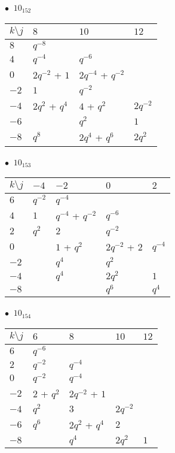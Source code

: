 %
\begin{minipage}{\linewidth}
$\bullet\ $ $10_{152}$ \vspace{0.5em} \\
\begin{tabular}{l|lll}
$k \setminus j$ & $8$ & $10$ & $12$ \\
\hline
$8$ & $q^{-8}$ &  &  \\
$4$ & $q^{-4}$ & $q^{-6}$ &  \\
$0$ & $2q^{-2}$ + $1$ & $2q^{-4}$ + $q^{-2}$ &  \\
$-2$ & $1$ & $q^{-2}$ &  \\
$-4$ & $2q^{2}$ + $q^{4}$ & $4$ + $q^{2}$ & $2q^{-2}$ \\
$-6$ &  & $q^{2}$ & $1$ \\
$-8$ & $q^{8}$ & $2q^{4}$ + $q^{6}$ & $2q^{2}$ \\
\end{tabular}
\vspace{2em}
\end{minipage}
%
\begin{minipage}{\linewidth}
$\bullet\ $ $10_{153}$ \vspace{0.5em} \\
\begin{tabular}{l|llll}
$k \setminus j$ & $-4$ & $-2$ & $0$ & $2$ \\
\hline
$6$ & $q^{-2}$ & $q^{-4}$ &  &  \\
$4$ & $1$ & $q^{-4}$ + $q^{-2}$ & $q^{-6}$ &  \\
$2$ & $q^{2}$ & $2$ & $q^{-2}$ &  \\
$0$ &  & $1$ + $q^{2}$ & $2q^{-2}$ + $2$ & $q^{-4}$ \\
$-2$ &  & $q^{4}$ & $q^{2}$ &  \\
$-4$ &  & $q^{4}$ & $2q^{2}$ & $1$ \\
$-8$ &  &  & $q^{6}$ & $q^{4}$ \\
\end{tabular}
\vspace{2em}
\end{minipage}
%
\begin{minipage}{\linewidth}
$\bullet\ $ $10_{154}$ \vspace{0.5em} \\
\begin{tabular}{l|llll}
$k \setminus j$ & $6$ & $8$ & $10$ & $12$ \\
\hline
$6$ & $q^{-6}$ &  &  &  \\
$2$ & $q^{-2}$ & $q^{-4}$ &  &  \\
$0$ & $q^{-2}$ & $q^{-4}$ &  &  \\
$-2$ & $2$ + $q^{2}$ & $2q^{-2}$ + $1$ &  &  \\
$-4$ & $q^{2}$ & $3$ & $2q^{-2}$ &  \\
$-6$ & $q^{6}$ & $2q^{2}$ + $q^{4}$ & $2$ &  \\
$-8$ &  & $q^{4}$ & $2q^{2}$ & $1$ \\
\end{tabular}
\vspace{2em}
\end{minipage}
